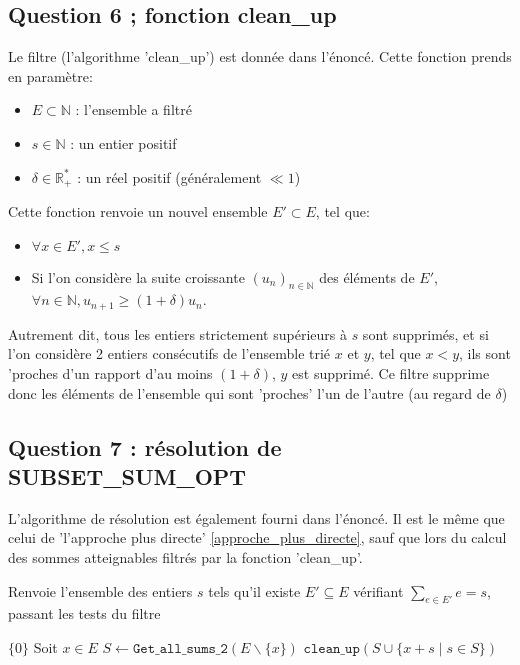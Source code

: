 \documentclass[10pt]{article}
\let\oldReturn\Return
\renewcommand{\Return}{\State\oldReturn}
\begin{document}
			\subsection{Question 6 ; fonction clean\_up}
				Le filtre (l'algorithme 'clean\_up') est donnée dans l'énoncé. Cette fonction prends en paramètre:
				\begin{itemize}[label=-]
					\setlength\itemsep{0.1em}
					\item $E \subset \mathbb{N}$ : l'ensemble a filtré
					\item $s \in \mathbb{N}$ : un entier positif
					\item $\delta \in \mathbb{R}_+^*$ : un réel positif (généralement $\ll 1$)
				\end{itemize}
				Cette fonction renvoie un nouvel ensemble $E' \subset E$, tel que:
				\begin{itemize}[label=-]
					\setlength\itemsep{0.1em}
					\item	$\forall x \in E' , x \leq s$
					\item	Si l'on considère la suite croissante $(u_n)_{n \in \mathbb{N}}$ des éléments de $E'$,
							$\forall n \in \mathbb{N}, u_{n + 1} \geq (1 + \delta)u_n $.
				\end{itemize}
	
				Autrement dit, tous les entiers strictement supérieurs à $s$ sont supprimés, et 
				si l'on considère 2 entiers consécutifs de l'ensemble trié $x$ et $y$, tel que $x < y$,
				ils sont 'proches d'un rapport d'au moins $(1 + \delta)$, $y$ est supprimé.
				Ce filtre supprime donc les éléments de l'ensemble qui sont 'proches' l'un de l'autre (au regard de $\delta$)

			\subsection{Question 7 : résolution de SUBSET\_SUM\_OPT}
				L'algorithme de résolution est également fourni dans l'énoncé.
				Il est le même que celui de 'l'approche plus directe' \ref{approche_plus_directe}, sauf que
				lors du calcul des sommes atteignables filtrés par la fonction 'clean\_up'.
				
				\begin{algorithm}
					\caption{Renvoie l'ensemble des entiers $s$ tels qu'il existe
							$E' \subseteq E$ vérifiant $\sum\limits_{e \in E'}e = s$, passant les tests du filtre}
					\begin{algorithmic}[1]
								\Return $\{0\}$
							\EndIf
							\State Soit $x \in E$
							\State $S \leftarrow \mathtt{Get\_all\_sums\_2}(E \backslash \{x\})$
							\Return $\mathtt{clean\_up}(S \cup \{x + s \mid s \in S\})$
						\EndFunction
					\end{algorithmic}
				\end{algorithm}
			
\end{document}

